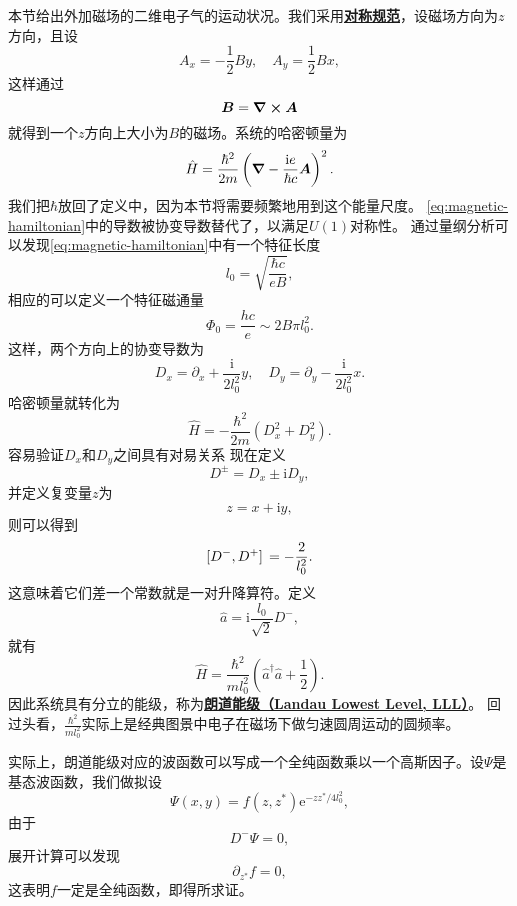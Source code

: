 \documentclass[UTF8, a4paper]{ctexart}
\newcommand*{\ee}{\mathrm{e}}
\newcommand*{\ii}{\mathrm{i}}
\newcommand{\concept}[1]{\underline{\textbf{#1}}}
\begin{document}
本节给出外加磁场的二维电子气的运动状况。我们采用\concept{对称规范}，设磁场方向为$z$方向，且设
\begin{equation}
    A_x = - \frac{1}{2} B y, \quad A_y = \frac{1}{2} B x,
\end{equation}
这样通过
\[
    \vb*{B} = \curl{\vb*{A}}
\]
就得到一个$z$方向上大小为$B$的磁场。系统的哈密顿量为
\begin{equation}
    \hat{H} = \frac{\hbar^2}{2m} \left( \grad - \frac{\ii e}{\hbar c} \vb*{A} \right)^2.
    \label{eq:magnetic-hamiltonian}
\end{equation}
我们把$\hbar$放回了定义中，因为本节将需要频繁地用到这个能量尺度。
\eqref{eq:magnetic-hamiltonian}中的导数被协变导数替代了，以满足$U(1)$对称性。
通过量纲分析可以发现\eqref{eq:magnetic-hamiltonian}中有一个特征长度
\begin{equation}
    l_0 = \sqrt{\frac{\hbar c}{e B}},
\end{equation}
相应的可以定义一个特征磁通量
\begin{equation}
    \Phi_0 = \frac{h c}{e} \sim 2 B \pi l_0^2.
\end{equation}
这样，两个方向上的协变导数为
\begin{equation}
    D_x = \partial_x + \frac{\ii}{2l_0^2} y, \quad D_y = \partial_y - \frac{\ii}{2l_0^2}x.
\end{equation}
哈密顿量就转化为
\[
    \hat{H} = - \frac{\hbar^2}{2m} (D_x^2 + D_y^2).
\]
容易验证$D_x$和$D_y$之间具有对易关系
现在定义
\begin{equation}
    D^\pm = D_x \pm \ii D_y,
\end{equation}
并定义复变量$z$为
\begin{equation}
    z = x + \ii y,
\end{equation}
则可以得到
\begin{equation}
    \comm*{D^-}{D^+} = - \frac{2}{l_0^2}.
\end{equation}
这意味着它们差一个常数就是一对升降算符。定义
\begin{equation}
    \hat{a} = \ii \frac{l_0}{\sqrt{2}} D^-,
\end{equation}
就有
\begin{equation}
    \hat{H} = \frac{\hbar^2}{m l_0^2} \left(\hat{a}^\dagger \hat{a} + \frac{1}{2} \right).
\end{equation}
因此系统具有分立的能级，称为\concept{朗道能级（Landau Lowest Level, LLL）}。
回过头看，$\frac{\hbar^2}{m l_0^2}$实际上是经典图景中电子在磁场下做匀速圆周运动的圆频率。

实际上，朗道能级对应的波函数可以写成一个全纯函数乘以一个高斯因子。设$\Psi$是基态波函数，我们做拟设
\begin{equation}
    \Psi(x, y) = f(z, z^*) \ee^{- z z^* / 4l_0^2},
    \label{eq:landau-wave-packet}
\end{equation}
由于
\[
    D^- \Psi = 0,
\]
展开计算可以发现
\[
    \partial_{z^*} f = 0,
\]
这表明$f$一定是全纯函数，即得所求证。
\end{document}
